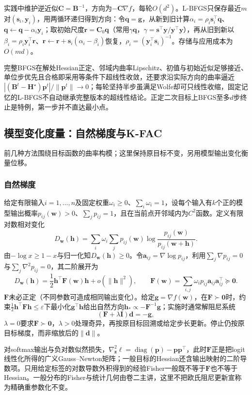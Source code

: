 实践中维护逆近似$\bm C=\bm B^{-1}$，方向为$-\bm C\nabla f$，每轮$O(d^2)$。L-BFGS只保存最近$m$对$(\bm s_i,\bm y_i)$，用两循环递归得到方向：令$\bm q=\bm g$，从新到旧计算$\alpha_i=\rho_i\bm s_i^\top\bm q$、$\bm q\leftarrow\bm q-\alpha_i\bm y_i$；取初始尺度$\bm r=\bm C_0\bm q$（常用$\gamma\bm q$，$\gamma=\bm s^\top\bm y/\bm y^\top\bm y$），再从旧到新以$\beta_i=\rho_i\bm y_i^\top\bm r$、$\bm r\leftarrow\bm r+\bm s_i(\alpha_i-\beta_i)$恢复，$\rho_i=(\bm y_i^\top\bm s_i)^{-1}$。存储与应用成本为$O(md)$。

完整BFGS在解处Hessian正定、邻域内曲率Lipschitz、初值与初始近似足够接近、单位步优先且合格即采用等条件下超线性收敛，还要求沿实际方向的曲率逼近$|(\bm B^t-\bm H^\star)\bm p^t|/\|\bm p^t\|\to0$；每轮坚持半步虽满足Wolfe却可只线性收缩，固定记忆的L-BFGS不自动继承完整版本的超线性结论。正定二次目标上BFGS至多$d$步终止是特例，第一步并不直达最小点。

\subsection{模型变化度量：自然梯度与K-FAC}

前几种方法围绕目标函数的曲率构模；这里保持原目标不变，另用模型输出变化衡量位移。

\subsubsection{自然梯度}

给定有限输入$i=1,\ldots,n$及固定权重$\omega_i\geq0$、$\sum_i\omega_i=1$，设每个输入有$k$个正的模型输出概率$p_{ij}(\bm w)>0$、$\sum_jp_{ij}=1$，且在当前点开邻域内为$C^2$函数。定义有限对数相对变化
\[
 D_{\bm w}(\bm h)=\sum_i\omega_i\sum_j p_{ij}(\bm w)
 \log\frac{p_{ij}(\bm w)}{p_{ij}(\bm w+\bm h)}.
\]
由$-\log x\geq1-x$与归一化知$D_{\bm w}(\bm h)\geq0$。令$\bm a_{ij}=\nabla\log p_{ij}$，利用$\sum_j\nabla p_{ij}=0$与$\sum_j\nabla^2p_{ij}=0$，其二阶展开为
\[
 D_{\bm w}(\bm h)=\frac12\bm h^\top\bm F(\bm w)\bm h+o(\|\bm h\|^2),
 \qquad
 \bm F(\bm w)=\sum_{i,j}\omega_i p_{ij}\bm a_{ij}\bm a_{ij}^\top\succeq\bm0.
\]
$\bm F$未必正定（不同参数可造成相同输出变化）。给定$\bm g=\nabla f(\bm w)$，在$\bm F\succ\bm0$时，约束$\frac12\bm h^\top\bm F\bm h\leq\varepsilon$下最小化$\bm g^\top\bm h$给出自然方向$\bm h_*\propto-\bm F^{-1}\bm g$；实施时通常解阻尼系统
\[
 (\bm F+\lambda\bm I)\bm d=-\bm g,
\]
$\lambda=0$要求$\bm F\succ\bm0$，$\lambda>0$处理奇异，再按原目标回溯或给定步长更新。停止仍按原目标梯度，而非缩放后的$\|\bm d\|$。

对softmax输出与负对数似然损失，$\nabla_{\bm z}^2\ell=\operatorname{diag}(\bm p)-\bm p\bm p^\top$，此时$\bm F$正是把logit线性化所得的广义Gauss--Newton矩阵；一般目标的Hessian还含输出映射的二阶导数项。只用给定标签的对数导数外积得到的经验Fisher一般既不等于$\bm F$也不等于Hessian。一般分布的Fisher与统计几何由卷二主讲，这里不把欧氏阻尼更新宣称为精确重参数化不变。

